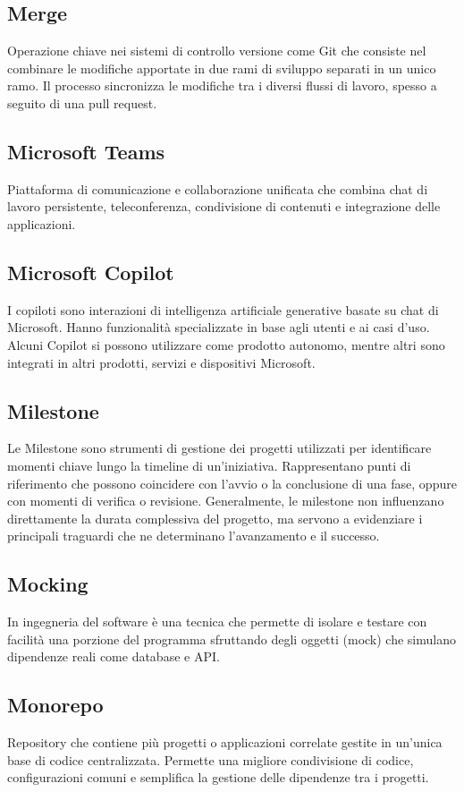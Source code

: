 \documentclass[10pt, letterpaper]{article}
\begin{document}
\subsection*{Merge}
Operazione chiave nei sistemi di controllo versione come Git che consiste nel combinare le modifiche apportate in due rami di sviluppo separati in un unico ramo.
Il processo sincronizza le modifiche tra i diversi flussi di lavoro, spesso a seguito di una pull request.

\subsection*{Microsoft Teams}
Piattaforma di comunicazione e collaborazione unificata che combina chat di lavoro persistente, teleconferenza, condivisione di contenuti e integrazione
delle applicazioni.

\subsection*{Microsoft Copilot}
I copiloti sono interazioni di intelligenza artificiale generative basate su chat di Microsoft. Hanno funzionalità specializzate in base agli utenti e ai casi
d'uso. Alcuni Copilot si possono utilizzare come prodotto autonomo, mentre altri sono integrati in altri prodotti, servizi e dispositivi Microsoft.

\subsection*{Milestone}
Le Milestone sono strumenti di gestione dei progetti utilizzati per identificare momenti chiave lungo la timeline di un'iniziativa. Rappresentano punti di
riferimento che possono coincidere con l'avvio o la conclusione di una fase, oppure con momenti di verifica o revisione. Generalmente, le milestone non
influenzano direttamente la durata complessiva del progetto, ma servono a evidenziare i principali traguardi che ne determinano l'avanzamento e il successo.

\subsection*{Mocking}
In ingegneria del software è una tecnica che permette di isolare e testare con facilità una porzione del programma sfruttando degli oggetti (mock) che simulano
dipendenze reali come database e API.

\subsection*{Monorepo}
Repository che contiene più progetti o applicazioni correlate gestite in un'unica base di
codice centralizzata. Permette una migliore condivisione di codice, configurazioni comuni e
semplifica la gestione delle dipendenze tra i progetti.
\end{document}
